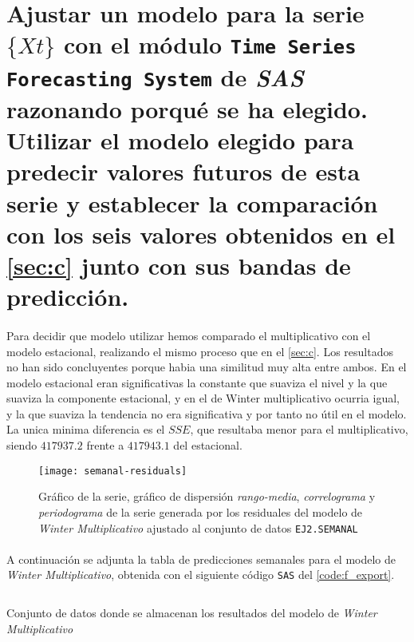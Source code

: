 \documentclass[a4paper, spanish]{article}
\begin{document}
  \section{Ajustar un modelo para la serie $\{ Xt \}$ con el módulo \texttt{Time Series Forecasting System} de \emph{SAS} razonando porqué se ha elegido. Utilizar el modelo elegido para predecir valores futuros de esta serie y establecer la comparación con los seis valores obtenidos en el \autoref{sec:c} junto con sus bandas de predicción.}
  \label{sec:f}


    \paragraph{}
    Para decidir que modelo utilizar hemos comparado el multiplicativo con el modelo estacional, realizando el mismo proceso que en el \autoref{sec:c}. Los resultados no han sido concluyentes porque habia una similitud muy alta entre ambos. En el modelo estacional eran significativas la constante que suaviza el nivel y la que suaviza la componente estacional, y en el de Winter multiplicativo ocurria igual, y la que suaviza la tendencia no era significativa y por tanto no útil en el modelo. La unica minima diferencia es el $SSE$, que resultaba menor para el multiplicativo, siendo $417937.2$ frente a $417943.1$ del estacional.

    \begin{figure}[htb!]
      \centering
      \texttt{[image: semanal-residuals]}
      \caption{Gráfico de la serie, gráfico de dispersión \emph{rango-media}, \emph{correlograma} y \emph{periodograma} de la serie generada por los residuales del modelo de \emph{Winter Multiplicativo} ajustado al conjunto de datos \texttt{EJ2.SEMANAL}}
      \label{img:residuals_semanal}
    \end{figure}

    \paragraph{}
    A continuación se adjunta la tabla de predicciones semanales para el modelo de \emph{Winter Multiplicativo}, obtenida con el siguiente código \texttt{SAS} del \autoref{code:f_export}.

    \begin{listing}[htb!]
      \centering
      \inputminted{SAS}{./res/code/f-export.sas}
      \caption{Conjunto de datos donde se almacenan los resultados del modelo de \emph{Winter Multiplicativo}}
      \label{code:f_export}
    \end{listing}
\end{document}
